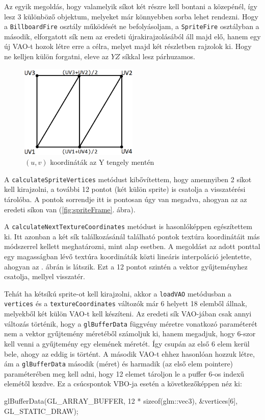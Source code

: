 Az egyik megoldás, hogy valamelyik síkot két részre kell bontani a közepénél, így lesz 3 különböző objektum, melyeket már könnyebben sorba lehet rendezni. Hogy a \texttt{BillboardFire} osztály működését ne befolyásoljam, a \texttt{SpriteFire} osztályban a második, elforgatott sík nem az eredeti újrakirajzolásából áll majd elő, hanem egy új VAO-t hozok létre erre a célra, melyet majd két részletben rajzolok ki. Hogy ne kelljen külön forgatni, eleve az $YZ$ síkkal lesz párhuzamos. 

\begin{figure}[h]
 \centering
 \includegraphics[width=0.5\textwidth]{kepek/billboardUVcoords.png}
 \caption{$(u, v)$ koordináták az Y tengely mentén}
 \label{fig:spriteUVcoords}
\end{figure}

A \texttt{calculateSpriteVertices} metódust kibővítettem, hogy amennyiben 2 síkot kell kirajzolni, a további 12 pontot (két külön sprite) is csatolja a visszatérési tárolóba. A pontok sorrendje itt is pontosan úgy van megadva, ahogyan az az eredeti síkon van (\ref{fig:spriteFrame}. ábra). 

A \texttt{calculateNextTextureCoordinates} metódust is hasonlóképpen egészítettem ki. Itt azonban a két sík találkozásánál található pontok textúra koordinátáit más módszerrel kellett meghatározni, mint alap esetben.
A megoldást az adott ponttal egy magasságban lévő textúra koordináták közti lineáris interpoláció jelentette, ahogyan az . ábrán is látszik. Ezt a 12 pontot szintén a vektor gyűjteményhez csatolja, mellyel visszatér.

Tehát ha kétsíkú sprite-ot kell kirajzolni, akkor a \texttt{loadVAO} metódusban a \texttt{vertices} és a \texttt{textureCoordinates} változók már 6 helyett 18 elemből állnak, melyekből két külön VAO-t kell készíteni. Az eredeti sík VAO-jában csak annyi változás történik, hogy a \texttt{glBufferData} függvény méretre vonatkozó paraméterét nem a vektor gyűjtemény méretéből számoljuk ki, hanem megadjuk, hogy 6-szor kell venni a gyűjtemény egy elemének méretét. Így csupán az első 6 elem kerül bele, ahogy az eddig is történt. A második VAO-t ehhez hasonlóan hozzuk létre, ám a \texttt{glBufferData} második (méret) és harmadik (az első elem pointere) paraméterében meg kell adni, hogy 12 elemet tároljon le a puffer 6-os indexű elemétől kezdve. Ez a csúcspontok VBO-ja esetén a következőképpen néz ki:
\begin{cpp}
glBufferData(GL_ARRAY_BUFFER, 12 * sizeof(glm::vec3), 
	&vertices[6], GL_STATIC_DRAW);
\end{cpp}

